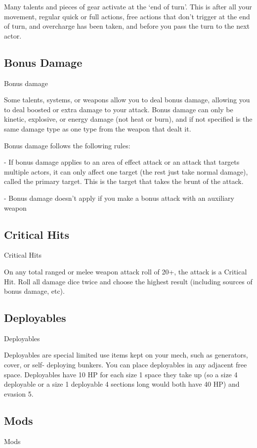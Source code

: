 Many talents and pieces of gear activate at the `end of turn'. This is after all your movement,
regular quick or full actions, free actions that don’t trigger at the end of turn, and overcharge has
been taken, and before you pass the turn to the next actor.

\subsection{Bonus Damage}
\hypertarget{BonusDamage}{Bonus damage}

Some talents, systems, or weapons allow you to deal bonus damage, allowing you to deal
boosted or extra damage to your attack. Bonus damage can only be kinetic, explosive, or energy
damage (not heat or burn), and if not specified is the same damage type as one type from the
weapon that dealt it.

Bonus damage follows the following rules:

         	- If bonus damage applies to an area of effect attack or an attack that targets multiple
         actors, it can only affect one target (the rest just take normal damage), called the primary
         target. This is the target that takes the brunt of the attack.

         	- Bonus damage doesn’t apply if you make a bonus attack with an auxiliary weapon

\subsection{Critical Hits}
\hypertarget{CriticalHit}{Critical Hits}

On any total ranged or melee weapon attack roll of 20+, the attack is a Critical Hit. Roll all
damage dice twice and choose the highest result (including sources of bonus damage, etc).

\subsection{Deployables}
\hypertarget{Deployable}{Deployables}

Deployables are special limited use items kept on your mech, such as generators, cover, or self-
deploying bunkers. You can place deployables in any adjacent free space. Deployables have 10
HP for each size 1 space they take up (so a size 4 deployable or a size 1 deployable 4 sections
long would both have 40 HP) and evasion 5.

\subsection{Mods}
\hypertarget{Mod}{Mods}

